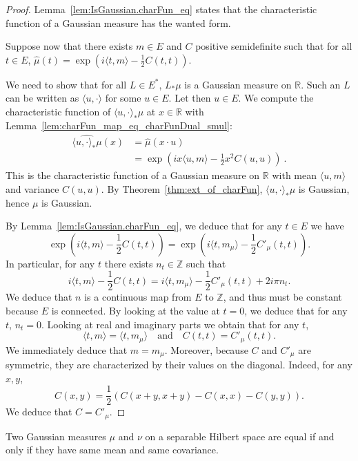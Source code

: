 \begin{proof}  
Lemma~\ref{lem:IsGaussian.charFun_eq} states that the characteristic function of a Gaussian measure has the wanted form.

Suppose now that there exists $m \in E$ and $C$ positive semidefinite such that for all $t \in E$, $\hat{\mu}(t) = \exp\left(i \langle t, m \rangle - \frac{1}{2} C(t, t)\right)$.

We need to show that for all $L \in E^*$, $L_*\mu$ is a Gaussian measure on $\mathbb{R}$.
Such an $L$ can be written as $\langle u, \cdot \rangle$ for some $u \in E$.
Let then $u \in E$. We compute the characteristic function of $\langle u, \cdot\rangle_*\mu$ at $x \in \mathbb{R}$ with Lemma~\ref{lem:charFun_map_eq_charFunDual_smul}:
\begin{align*}
  \widehat{\langle u, \cdot\rangle_*\mu}(x)
  &= \hat{\mu}(x \cdot u)
  \\
  &= \exp\left(i x \langle u, m \rangle - \frac{1}{2} x^2 C(u, u)\right)
  \: .
\end{align*}
This is the characteristic function of a Gaussian measure on $\mathbb{R}$ with mean $\langle u, m \rangle$ and variance $C(u, u)$.
By Theorem~\ref{thm:ext_of_charFun}, $\langle u, \cdot\rangle_*\mu$ is Gaussian, hence $\mu$ is Gaussian.

By Lemma~\ref{lem:IsGaussian.charFun_eq}, we deduce that for any $t \in E$ we have
$$\exp\left(i\langle t, m \rangle - \frac{1}{2} C(t, t)\right) = \exp\left(i\langle t, m_\mu \rangle - \frac{1}{2} C'_\mu(t, t)\right).$$
In particular, for any $t$ there exists $n_t \in \mathbb{Z}$ such that
$$i\langle t, m \rangle - \frac{1}{2} C(t, t) = i\langle t, m_\mu \rangle - \frac{1}{2} C'_\mu(t, t) + 2i\pi n_t.$$
We deduce that $n$ is a continuous map from $E$ to $\mathbb{Z}$, and thus must be constant because $E$ is connected. By looking at the value at $t = 0$, we deduce that for any $t$, $n_t = 0$. Looking at real and imaginary parts we obtain that for any $t$,
$$\langle t, m \rangle = \langle t, m_\mu \rangle \quad \text{and} \quad C(t, t) = C'_\mu(t, t).$$
We immediately deduce that $m = m_\mu$. Moreover, because $C$ and $C'_\mu$ are symmetric, they are characterized by their values on the diagonal. Indeed, for any $x, y$,
$$C(x, y) = \frac{1}{2} (C(x + y, x + y) - C(x, x) - C(y, y)).$$
We deduce that $C = C'_\mu$.
\end{proof}

\begin{lemma}\label{lem:IsGaussian.ext_iff}
Two Gaussian measures $\mu$ and $\nu$ on a separable Hilbert space are equal if and only if they have same mean and same covariance.
\end{lemma}

